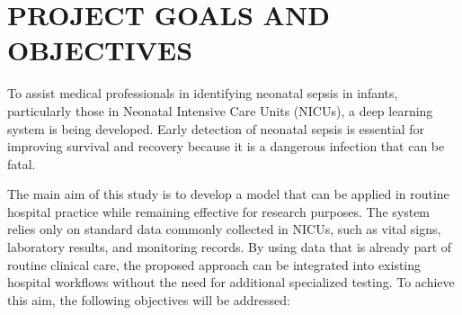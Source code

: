 \documentclass[conference]{IEEEtran}
\begin{document}
\section {PROJECT GOALS AND OBJECTIVES  }
To assist medical professionals in identifying neonatal sepsis in infants, particularly those in Neonatal Intensive Care Units (NICUs), a deep learning system is being developed. Early detection of neonatal sepsis is essential for improving survival and recovery because it is a dangerous infection that can be fatal.

The main aim of this study is to develop a model that can be applied in routine hospital practice while remaining effective for research purposes. The system relies only on standard data commonly collected in NICUs, such as vital signs, laboratory results, and monitoring records. By using data that is already part of routine clinical care, the proposed approach can be integrated into existing hospital workflows without the need for additional specialized testing. To achieve this aim, the following objectives will be addressed:
\end{document}
